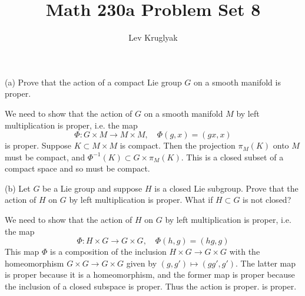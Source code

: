 \documentclass{../../templates/lkx_pset}
\title{Math 230a Problem Set 8}
\author{Lev Kruglyak}
\begin{document}
\maketitle

\begin{problem}{3}
\end{problem}
\begin{parts}
	\begin{part}{(a)}
		Prove that the action of a compact Lie group $G$ on a smooth manifold is proper.
	\end{part}

  We need to show that the action of $G$ on a smooth manifold $M$ by left multiplication is proper, i.e. the map
  \[
    \Phi : G \times M \to M \times M,\quad \Phi(g,x)=(gx,x)
  \]
  is proper. Suppose $K\subset M\times M$ is compact. Then the projection $\pi_M(K)$ onto $M$ must be compact, and $\Phi^{-1}(K)\subset G\times \pi_M(K)$. This is a closed subset of a compact space and so must be compact.

	\begin{part}{(b)}
		Let $G$ be a Lie group and suppose $H$ is a closed Lie subgroup. Prove that the action of $H$ on $G$ by left multiplication is proper. What if $H\subset G$ is not closed?
	\end{part}

  We need to show that the action of $H$ on $G$ by left multiplication is proper, i.e. the map
  \[
    \Phi : H \times G \to G \times G,\quad \Phi(h,g)=(hg,g)
  \]
  This map $\Phi$ is a composition of the inclusion $H\times G\to G\times G$ with the homeomorphism $G\times G \to G\times G$ given by $(g,g')\mapsto (gg', g')$. The latter map is proper because it is a homeomorphism, and the former map is proper because the inclusion of a closed subspace is proper. Thus the action is proper.
  is proper.
\end{parts}
\end{document}
